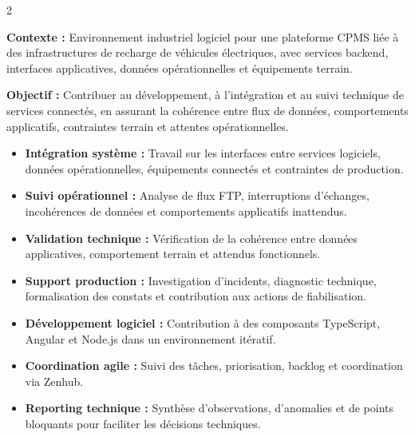 \documentclass[8pt,a4paper,ragged2e,withhyper]{altacv}
\begin{document}



\makecvheader
\vspace{-0.3cm}


\begin{paracol}{2}



\textbf{Contexte :} Environnement industriel logiciel pour une plateforme CPMS liée à des infrastructures de recharge de véhicules électriques, avec services backend, interfaces applicatives, données opérationnelles et équipements terrain.

\textbf{Objectif :} Contribuer au développement, à l’intégration et au suivi technique de services connectés, en assurant la cohérence entre flux de données, comportements applicatifs, contraintes terrain et attentes opérationnelles.

\begin{itemize}
  \item \textbf{Intégration système :} Travail sur les interfaces entre services logiciels, données opérationnelles, équipements connectés et contraintes de production.
  \item \textbf{Suivi opérationnel :} Analyse de flux FTP, interruptions d’échanges, incohérences de données et comportements applicatifs inattendus.
  \item \textbf{Validation technique :} Vérification de la cohérence entre données applicatives, comportement terrain et attendus fonctionnels.
  \item \textbf{Support production :} Investigation d’incidents, diagnostic technique, formalisation des constats et contribution aux actions de fiabilisation.
  \item \textbf{Développement logiciel :} Contribution à des composants TypeScript, Angular et Node.js dans un environnement itératif.
  \item \textbf{Coordination agile :} Suivi des tâches, priorisation, backlog et coordination via Zenhub.
  \item \textbf{Reporting technique :} Synthèse d’observations, d’anomalies et de points bloquants pour faciliter les décisions techniques.
\end{itemize}


\end{paracol}
\end{document}
